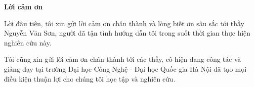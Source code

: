\begin{center}
\textbf{\large{Lời cảm ơn}	}
\end{center}

Lời đầu tiên, tôi xin gửi lời cảm ơn chân thành và lòng biết ơn sâu sắc tới thầy Nguyễn Văn Sơn, người đã tận tình hướng dẫn tôi trong suốt thời gian thực hiện nghiên cứu này.

Tôi cũng xin gửi lời cảm ơn chân thành tới các thầy, cô hiện đang công tác và giảng dạy tại trường Đại học Công Nghệ - Đại học Quốc gia Hà Nội đã tạo mọi điều kiện thuận lợi cho chúng tôi học tập và nghiên cứu.

